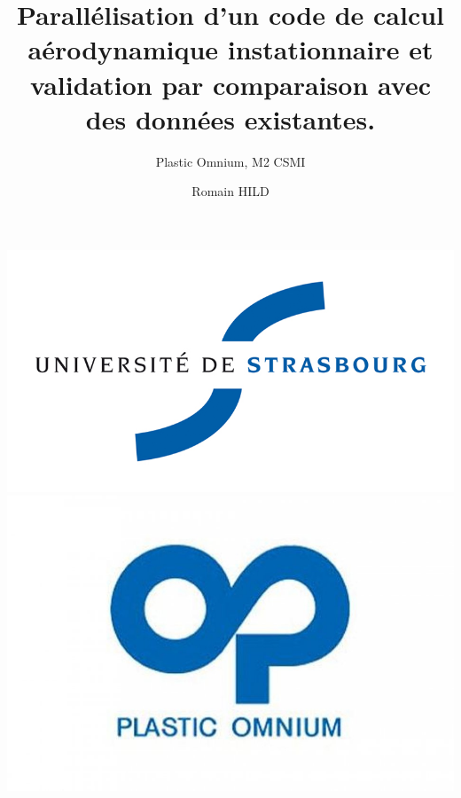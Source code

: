 \documentclass{beamer}
\title[Stage]{Parallélisation d'un code de calcul aérodynamique instationnaire et validation par comparaison avec des données existantes.}
\subtitle{Plastic Omnium, M2 CSMI}
\author{Romain HILD}
\institute{Université de Strasbourg}
\begin{document}
\begin{frame}
\includegraphics[scale=0.2]{uds.jpg}\includegraphics[scale=0.15]{po.jpg}
\titlepage
\end{frame}
\end{document}
